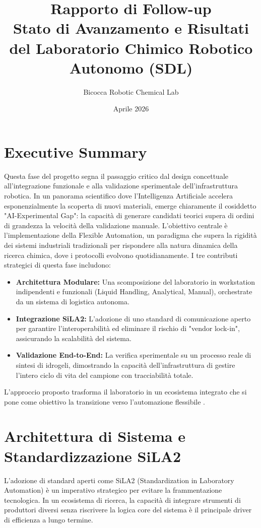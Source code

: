 \documentclass[11pt,a4paper]{article}
\title{\vspace{-1.5cm}\textbf{\huge Rapporto di Follow-up}\\ \Large Stato di Avanzamento e Risultati del Laboratorio Chimico Robotico Autonomo (SDL)}
\author{Bicocca Robotic Chemical Lab}
\date{Aprile 2026}
\begin{document}
	
	\maketitle
	

	\section*{Executive Summary}
	Questa fase del progetto segna il passaggio critico dal design concettuale all’integrazione funzionale e alla validazione sperimentale dell'infrastruttura robotica. In un panorama scientifico dove l’Intelligenza Artificiale accelera esponenzialmente la scoperta di nuovi materiali, emerge chiaramente il cosiddetto "AI-Experimental Gap": la capacità di generare candidati teorici supera di ordini di grandezza la velocità della validazione manuale. L'obiettivo centrale è l'implementazione della Flexible Automation, un paradigma che supera la rigidità dei sistemi industriali tradizionali per rispondere alla natura dinamica della ricerca chimica, dove i protocolli evolvono quotidianamente.
	I tre contributi strategici di questa fase includono:
	\begin{itemize}[]
	\item \textbf{Architettura Modulare:} Una scomposizione del laboratorio in workstation indipendenti e funzionali (Liquid Handling, Analytical, Manual), orchestrate da un sistema di logistica autonoma.
	\item \textbf{Integrazione SiLA2:} L'adozione di uno standard di comunicazione aperto per garantire l’interoperabilità ed eliminare il rischio di "vendor lock-in", assicurando la scalabilità del sistema.
	\item \textbf{Validazione End-to-End:} La verifica sperimentale su un processo reale di sintesi di idrogeli, dimostrando la capacità dell’infrastruttura di gestire l’intero ciclo di vita del campione con tracciabilità totale.
	\end{itemize}
	
	\noindent L'approccio proposto trasforma il laboratorio in un ecosistema integrato che si pone come obiettivo la transizione verso l'automazione flessibile .
	
	
	\newpage
	\tableofcontents
	\newpage
	
	\section{Architettura di Sistema e Standardizzazione SiLA2}
	L’adozione di standard aperti come SiLA2 (Standardization in Laboratory Automation) è un imperativo strategico per evitare la frammentazione tecnologica. In un ecosistema di ricerca, la capacità di integrare strumenti di produttori diversi senza riscrivere la logica core del sistema è il principale driver di efficienza a lungo termine.
	
\end{document}
